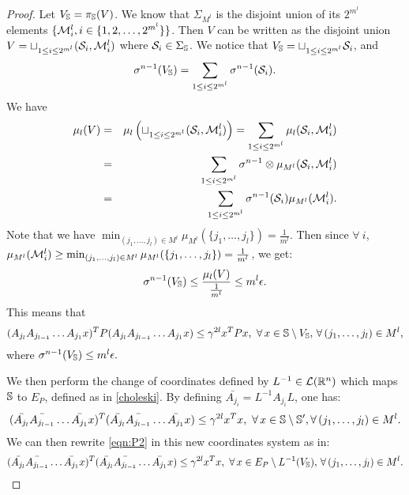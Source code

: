 \begin{proof}
Let $V_{\mathbb{S}} = \pi_{\mathbb{S}}(V)$. We know that $\Sigma_{M^l}$ is the disjoint union of its $2^{m^l}$ elements $\{\mathcal{M}^l_i, i \in \{1,2, \dots, 2^{m^l} \} \}$. Then $V$ can be written as the disjoint union $V = \sqcup_{1 \leq i \leq 2^{m^l}} (\mathcal{S}_i, \mathcal{M}^l_i)$ where $\mathcal{S}_i \in \Sigma_{\mathbb{S}}$. We notice that 
$V_{\mathbb{S}} = \sqcup_{1 \leq i \leq 2^{m^l}} \mathcal{S}_i$, 
and
\begin{equation*}
\sigma^{n-1} (V_{\mathbb{S}}) = \sum_{1 \leq i \leq 2^{m^l}} \sigma^{n-1} (\mathcal{S}_i).
\end{equation*}
We have 
\begin{eqnarray*}
\mu_l(V) &=& \mu_l \left( \sqcup_{1 \leq i \leq 2^{m^l}} (\mathcal{S}_i, \mathcal{M}^l_i) \right) = \sum_{1 \leq i \leq 2^{m^l}} \mu_l(\mathcal{S}_i, \mathcal{M}^l_i) \\
 &=& \sum_{1 \leq i \leq 2^{m^l}} \sigma^{n-1} \otimes \mu_{M^l} (\mathcal{S}_i, \mathcal{M}^l_i) \\
 & = &\sum_{1 \leq i \leq 2^{m^l}} \sigma^{n-1}(\mathcal{S}_i) \mu_{M^l} (\mathcal{M}^l_i).
\end{eqnarray*}
Note that we have $\min_{(j_1,\dots,j_l) \in M^l} \mu_{M^l}(\{j_1,\dots,j_l\}) = \frac{1}{m^l}.$ Then since $ \forall \ i$, $\mu_{M^l}(\mathcal{M}^l_i) \geq \min_{(j_1,\dots,j_l) \in M^l} \mu_{M^l}(\{j_1,\dots,j_l\}) = \frac{1}{m^l}$, we get:
\begin{equation}
\sigma^{n-1}(V_{\mathbb{S}}) \leq \frac{\mu_l(V)}{\frac{1}{m^l}} \leq m^l \epsilon.
\end{equation}
This means that 
\begin{equation}\label{eqn:P2}
(A_{j_l} A_{j_{l-1}} \dots A_{j_1} x)^T P (A_{j_l} A_{j_{l-1}} \dots A_{j_1} x) \leq \gamma^{2l} x^T P x,\,\, \forall\, x \in \mathbb{S} \setminus V_{\mathbb{S}}, \,\forall\, (j_1,\dots,j_l) \in M^l,
\end{equation}
where $\sigma^{n-1}(V_{\mathbb{S}}) \leq m^l \epsilon.$

We then perform the change of coordinates defined by $L^{-1} \in \mathcal{L}(\mathbb{R}^n)$ which maps $\mathbb{S}$ to $E_P$, defined as in \eqref{choleski}. By defining $\bar{A_{j_i}}=  L^{-1} A_{j_i} L$, one has:
\begin{equation*}\label{eqn:thm01-2}
(\bar{A_{j_l}} \bar{A_{j_{l-1}}} \dots \bar{A_{j_1}} x)^T (\bar{A_{j_l}} \bar{A_{j_{l-1}}} \dots \bar{A_{j_1}} x) \leq {\gamma}^{2l} x^T x,\,\, \forall\, x \in \mathbb{S} \setminus \mathbb{S}', \forall\, (j_1,\dots,j_l) \in M^l.
\end{equation*}
We can then rewrite
\eqref{eqn:P2} in this new coordinates system as in: 
\begin{equation}
(\bar{A_{j_l}} \bar{A_{j_{l-1}}} \dots \bar{A_{j_1}} x)^T (\bar{A_{j_l}} \bar{A_{j_{l-1}}} \dots \bar{A_{j_1}} x) \leq {\gamma}^{2l} x^T x,\,\, \forall\, x \in E_P\setminus L^{-1}(V_{\mathbb{S}}), \,\forall\, (j_1,\dots,j_l) \in M^l.
\end{equation}


\end{proof}
